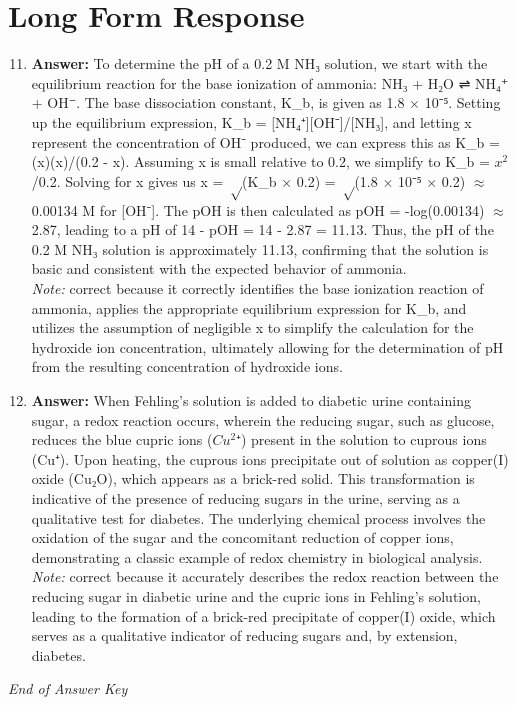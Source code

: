 \documentclass[12pt]{article}
\begin{document}
\section*{Long Form Response}
\begin{enumerate}[label=\arabic*.]
\setcounter{enumi}{10}
\item \textbf{Answer:} To determine the pH of a 0.2 M NH₃ solution, we start with the equilibrium reaction for the base ionization of ammonia: NH₃ + H₂O ⇌ NH₄⁺ + OH⁻. The base dissociation constant, K\_b, is given as 1.8 \ensuremath{\times} 10⁻⁵. Setting up the equilibrium expression, K\_b = [NH₄⁺][OH⁻]/[NH₃], and letting x represent the concentration of OH⁻ produced, we can express this as K\_b = (x)(x)/(0.2 - x). Assuming x is small relative to 0.2, we simplify to K\_b = $x^2$/0.2. Solving for x gives us x = \ensuremath{\sqrt}(K\_b \ensuremath{\times} 0.2) = \ensuremath{\sqrt}(1.8 \ensuremath{\times} 10⁻⁵ \ensuremath{\times} 0.2) \ensuremath{\approx} 0.00134 M for [OH⁻]. The pOH is then calculated as pOH = -log(0.00134) \ensuremath{\approx} 2.87, leading to a pH of 14 - pOH = 14 - 2.87 = 11.13. Thus, the pH of the 0.2 M NH₃ solution is approximately 11.13, confirming that the solution is basic and consistent with the expected behavior of ammonia.
\\ \textit{Note:} correct because it correctly identifies the base ionization reaction of ammonia, applies the appropriate equilibrium expression for K\_b, and utilizes the assumption of negligible x to simplify the calculation for the hydroxide ion concentration, ultimately allowing for the determination of pH from the resulting concentration of hydroxide ions.
\item \textbf{Answer:} When Fehling's solution is added to diabetic urine containing sugar, a redox reaction occurs, wherein the reducing sugar, such as glucose, reduces the blue cupric ions ($Cu^2$⁺) present in the solution to cuprous ions (Cu⁺). Upon heating, the cuprous ions precipitate out of solution as copper(I) oxide (Cu₂O), which appears as a brick-red solid. This transformation is indicative of the presence of reducing sugars in the urine, serving as a qualitative test for diabetes. The underlying chemical process involves the oxidation of the sugar and the concomitant reduction of copper ions, demonstrating a classic example of redox chemistry in biological analysis.
\\ \textit{Note:} correct because it accurately describes the redox reaction between the reducing sugar in diabetic urine and the cupric ions in Fehling's solution, leading to the formation of a brick-red precipitate of copper(I) oxide, which serves as a qualitative indicator of reducing sugars and, by extension, diabetes.
\end{enumerate}

\vfill
\noindent\textit{End of Answer Key}
\end{document}
